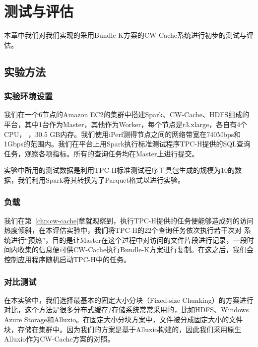 \chapter{测试与评估}

\par 本章中我们对我们实现的采用Bundle-K方案的CW-Cache系统进行初步的测试与评估。

\section{实验方法}

\subsection{实验环境设置}

\par 我们在一个6节点的Amazon EC2的集群中搭建Spark、CW-Cache、HDFS组成的平台，其中1台作为Master，其他作为Worker，每个节点是r3.xlarge，各自有4个CPU， ，30.5 GB内存。我们使用iPerf测得节点之间的网络带宽在740Mbps和1Gbps的范围内。我们在平台上用Spark执行标准测试程序TPC-H提供的SQL查询任务，观察各项指标。所有的查询任务均在Master上进行提交。

\par 实验中所用的测试数据是利用TPC-H标准测试程序工具包生成的规模为$10$的数据，我们利用Spark将其转换为了Parquet格式以进行实验。

\subsection{负载}

\par 我们在第~\ref{chp:cw-cache}章就观察到，执行TPC-H提供的任务便能够造成列的访问热度倾斜，在本评估实验中，我们将TPC-H的22个查询任务依次执行若干次对 系统进行“预热”，目的是让Master在这个过程中对访问的文件片段进行记录，一段时间内收集的信息便可供CW-Cache执行Bundle-K方案进行复制。在这之后，我们会控制应用程序随机启动TPC-H中的任务。

\subsection{对比测试}

\par 在本实验中，我们选择最基本的固定大小分块（Fixed-size Chunking）的方案进行对比，这个方法是很多分布式缓存/存储系统常常采用的，比如HDFS、Windows Azure Storage和Alluxio。在固定大小分块方案中，文件被分成固定大小的文件块，存储在集群中。因为我们的方案是基于Alluxio构建的，因此我们采用原生Alluxio作为CW-Cache方案的对照。

